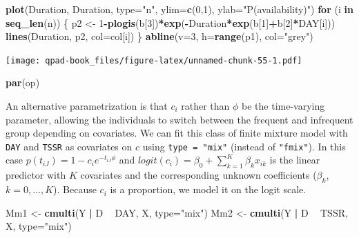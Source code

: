 \documentclass[12pt,]{book}
\newenvironment{Shaded}{\begin{snugshade}}{\end{snugshade}}
\newcommand{\ControlFlowTok}[1]{\textcolor[rgb]{0.13,0.29,0.53}{\textbf{#1}}}
\newcommand{\DataTypeTok}[1]{\textcolor[rgb]{0.13,0.29,0.53}{#1}}
\newcommand{\DecValTok}[1]{\textcolor[rgb]{0.00,0.00,0.81}{#1}}
\newcommand{\KeywordTok}[1]{\textcolor[rgb]{0.13,0.29,0.53}{\textbf{#1}}}
\newcommand{\NormalTok}[1]{#1}
\newcommand{\OperatorTok}[1]{\textcolor[rgb]{0.81,0.36,0.00}{\textbf{#1}}}
\newcommand{\StringTok}[1]{\textcolor[rgb]{0.31,0.60,0.02}{#1}}
\begin{document}
\begin{Shaded}
\begin{Highlighting}[]
\KeywordTok{plot}\NormalTok{(Duration, Duration, }\DataTypeTok{type=}\StringTok{"n"}\NormalTok{, }\DataTypeTok{ylim=}\KeywordTok{c}\NormalTok{(}\DecValTok{0}\NormalTok{,}\DecValTok{1}\NormalTok{),}
    \DataTypeTok{ylab=}\StringTok{"P(availability)"}\NormalTok{)}
\ControlFlowTok{for}\NormalTok{ (i }\ControlFlowTok{in} \KeywordTok{seq_len}\NormalTok{(n)) \{}
\NormalTok{    p2 <-}\StringTok{ }\DecValTok{1}\OperatorTok{-}\KeywordTok{plogis}\NormalTok{(b[}\DecValTok{3}\NormalTok{])}\OperatorTok{*}\KeywordTok{exp}\NormalTok{(}\OperatorTok{-}\NormalTok{Duration}\OperatorTok{*}\KeywordTok{exp}\NormalTok{(b[}\DecValTok{1}\NormalTok{]}\OperatorTok{+}\NormalTok{b[}\DecValTok{2}\NormalTok{]}\OperatorTok{*}\NormalTok{DAY[i]))}
    \KeywordTok{lines}\NormalTok{(Duration, p2, }\DataTypeTok{col=}\NormalTok{col[i])}
\NormalTok{\}}
\KeywordTok{abline}\NormalTok{(}\DataTypeTok{v=}\DecValTok{3}\NormalTok{, }\DataTypeTok{h=}\KeywordTok{range}\NormalTok{(p1), }\DataTypeTok{col=}\StringTok{"grey"}\NormalTok{)}
\end{Highlighting}
\end{Shaded}

\texttt{[image: qpad-book\_files/figure-latex/unnamed-chunk-55-1.pdf]}

\begin{Shaded}
\begin{Highlighting}[]
\KeywordTok{par}\NormalTok{(op)}
\end{Highlighting}
\end{Shaded}

An alternative parametrization is that \(c_{i}\) rather than \(\phi\) be the time-varying parameter,
allowing the individuals to switch between the frequent and infrequent group depending on covariates.
We can fit this class of finite mixture model with \texttt{DAY} and \texttt{TSSR} as covariates on \(c\)
using \texttt{type\ =\ "mix"} (instead of \texttt{"fmix"}).
In this case \(p(t_{iJ}) = 1 - c_{i} e^{-t_{iJ} \phi}\) and
\(logit(c_{i}) = \beta_{0} + \sum^{K}_{k=1} \beta_{k} x_{ik}\) is the linear predictor with \(K\)
covariates and the corresponding unknown coefficients (\(\beta_{k}\), \(k = 0,\ldots, K\)).
Because \(c_{i}\) is a proportion, we model it on the logit scale.

\begin{Shaded}
\begin{Highlighting}[]
\NormalTok{Mm1 <-}\StringTok{ }\KeywordTok{cmulti}\NormalTok{(Y }\OperatorTok{|}\StringTok{ }\NormalTok{D }\OperatorTok{~}\StringTok{ }\NormalTok{DAY, X, }\DataTypeTok{type=}\StringTok{"mix"}\NormalTok{)}
\NormalTok{Mm2 <-}\StringTok{ }\KeywordTok{cmulti}\NormalTok{(Y }\OperatorTok{|}\StringTok{ }\NormalTok{D }\OperatorTok{~}\StringTok{ }\NormalTok{TSSR, X, }\DataTypeTok{type=}\StringTok{"mix"}\NormalTok{)}
\end{Highlighting}
\end{Shaded}
\end{document}
